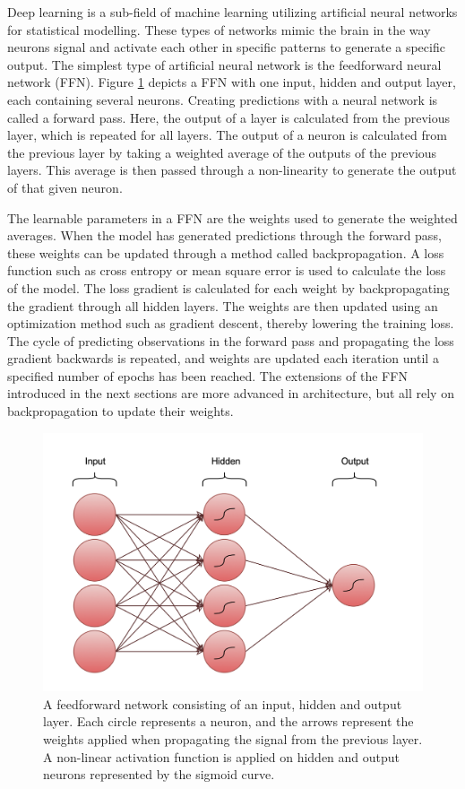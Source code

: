 Deep learning is a sub-field of machine learning utilizing artificial neural networks for statistical modelling. These types of networks mimic the brain in the way neurons signal and activate each other in specific patterns to generate a specific output. The simplest type of artificial neural network is the feedforward neural network (FFN). Figure \ref{fig:feed_forward} depicts a FFN with one input, hidden and output layer, each containing several neurons. Creating predictions with a neural network is called a forward pass. Here, the output of a layer is calculated from the previous layer, which is repeated for all layers. The output of a neuron is calculated from the previous layer by taking a weighted average of the outputs of the previous layers. This average is then passed through a non-linearity to generate the output of that given neuron.

The learnable parameters in a FFN are the weights used to generate the weighted averages. When the model has generated predictions through the forward pass, these weights can be updated through a method called backpropagation. A loss function such as cross entropy or mean square error is used to calculate the loss of the model. The loss gradient is calculated for each weight by backpropagating the gradient through all hidden layers. The weights are then updated using an optimization method such as gradient descent, thereby lowering the training loss. The cycle of predicting observations in the forward pass and propagating the loss gradient backwards is repeated, and weights are updated each iteration until a specified number of epochs has been reached. The extensions of the FFN introduced in the next sections are more advanced in architecture, but all rely on backpropagation to update their weights.

\begin{figure}
    \centering
    \includegraphics[width=0.75\linewidth]{figures/feed_forward.png}
    \caption{A feedforward network consisting of an input, hidden and output layer. Each circle represents a neuron, and the arrows represent the weights applied when propagating the signal from the previous layer. A non-linear activation function is applied on hidden and output neurons represented by the sigmoid curve.}
    \label{fig:feed_forward}
\end{figure}

